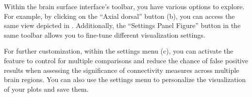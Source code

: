 \documentclass[justified]{tufte-handout}
\begin{document}
Within the brain surface interface's toolbar, you have various options to explore. For example, by clicking on the “Axial dorsal” button (b), you can access the same view depicted in . Additionally, the “Settings Panel Figure” button in the same toolbar allows you to fine-tune different visualization settings.

For further customization, within the settings menu (c), you can activate the  feature to control for multiple comparisons and reduce the chance of false positive results when assessing the significance of connectivity measures across multiple brain regions. You can also use the settings menu to personalize the visualization of your plots and save them.
\end{document}
